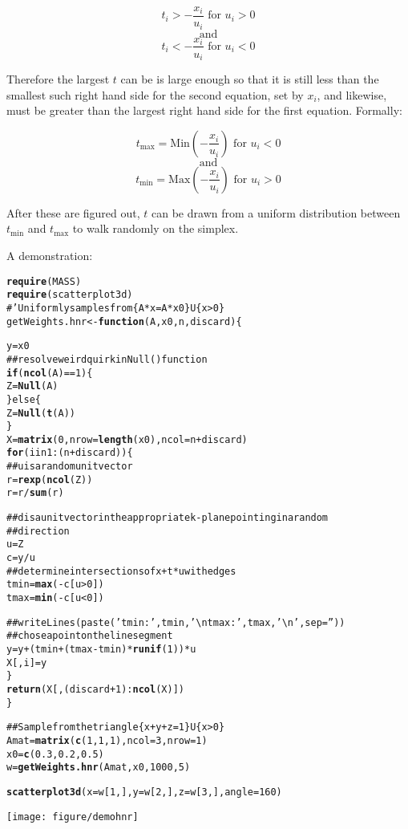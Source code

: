 \documentclass{article}\usepackage{graphicx, color}
\makeatletter
\def\maxwidth{ %
  \ifdim\Gin@nat@width>\linewidth
    \linewidth
  \else
    \Gin@nat@width
  \fi
}
\newcommand{\hlfunctioncall}[1]{\textcolor[rgb]{0.501960784313725,0,0.329411764705882}{\textbf{#1}}}%
\newcommand{\hlcomment}[1]{\textcolor[rgb]{0.180392156862745,0.6,0.341176470588235}{#1}}%
\newenvironment{kframe}{%
 \def\at@end@of@kframe{}%
 \ifinner\ifhmode%
  \def\at@end@of@kframe{\end{minipage}}%
  \begin{minipage}{\columnwidth}%
 \fi\fi%
 \def\FrameCommand##1{\hskip\@totalleftmargin \hskip-\fboxsep
 \colorbox{shadecolor}{##1}\hskip-\fboxsep
     \hskip-\linewidth \hskip-\@totalleftmargin \hskip\columnwidth}%
 \MakeFramed {\advance\hsize-\width
   \@totalleftmargin\z@ \linewidth\hsize
   \@setminipage}}%
 {\par\unskip\endMakeFramed%
 \at@end@of@kframe}
\newenvironment{knitrout}{}{} %
\makeatother
\begin{document}
$$ t_i > -\frac{x_i}{u_i} \text{ for } u_i > 0 $$
$$ \text{and}$$
$$ t_i < -\frac{x_i}{u_i} \text{ for } u_i < 0 $$

Therefore the largest $t$ can be is large enough so that it is still
less than the smallest such right hand side for the second equation,
set by $x_i$, and likewise, must be greater than the largest right
hand side for the first equation. Formally:

$$  t_{\text{max}} = \text{Min}(-\frac{x_i}{u_i}) \text{ for } u_i < 0 $$
$$ \text{and}$$
$$  t_{\text{min}} = \text{Max}(-\frac{x_i}{u_i}) \text{ for } u_i > 0 $$

After these are figured out, $t$ can be drawn from a uniform
distribution between $t_{\text{min}}$ and $t_{\text{max}}$ to walk
randomly on the simplex.
\newpage

\noindent A demonstration:

\begin{knitrout}
\color{fgcolor}\begin{kframe}
\begin{alltt}
\hlfunctioncall{require}(MASS)
\hlfunctioncall{require}(scatterplot3d)
\hlcomment{#' Uniformly samples from \{A*x=A*x0\} U \{x>0\}}
getWeights.hnr <- \hlfunctioncall{function}(A, x0, n, discard) \{
    
    y = x0
\hlcomment{    ## resolve weird quirk in Null() function}
    \hlfunctioncall{if} (\hlfunctioncall{ncol}(A) == 1) \{
        Z = \hlfunctioncall{Null}(A)
    \} else \{
        Z = \hlfunctioncall{Null}(\hlfunctioncall{t}(A))
    \}
    X = \hlfunctioncall{matrix}(0, nrow = \hlfunctioncall{length}(x0), ncol = n + discard)
    \hlfunctioncall{for} (i in 1:(n + discard)) \{
\hlcomment{        ## u is a random unit vector}
        r = \hlfunctioncall{rexp}(\hlfunctioncall{ncol}(Z))
        r = r/\hlfunctioncall{sum}(r)
        
\hlcomment{        ## d is a unit vector in the appropriate k-plane pointing in a random}
\hlcomment{        ## direction}
        u = Z %*% r
        c = y/u
\hlcomment{        ## determine intersections of x + t*u with edges}
        tmin = \hlfunctioncall{max}(-c[u > 0])
        tmax = \hlfunctioncall{min}(-c[u < 0])
        
\hlcomment{        ## writeLines(paste('tmin: ', tmin, '\textbackslash{}ntmax: ', tmax, '\textbackslash{}n', sep = ''))}
\hlcomment{        ## chose a point on the line segment}
        y = y + (tmin + (tmax - tmin) * \hlfunctioncall{runif}(1)) * u
        X[, i] = y
    \}
    \hlfunctioncall{return}(X[, (discard + 1):\hlfunctioncall{ncol}(X)])
\}


\hlcomment{## Sample from the triangle \{x+y+z =1\} U \{x>0\}}
Amat = \hlfunctioncall{matrix}(\hlfunctioncall{c}(1, 1, 1), ncol = 3, nrow = 1)
x0 = \hlfunctioncall{c}(0.3, 0.2, 0.5)
w = \hlfunctioncall{getWeights.hnr}(Amat, x0, 1000, 5)

\hlfunctioncall{scatterplot3d}(x = w[1, ], y = w[2, ], z = w[3, ], angle = 160)
\end{alltt}
\end{kframe}
\texttt{[image: figure/demohnr]} 

\end{knitrout}
\end{document}
